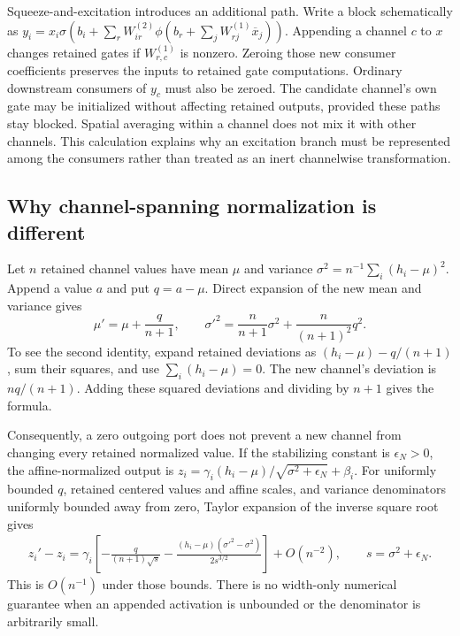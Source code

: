 \documentclass[10pt]{article}
\theoremstyle{paper}
\begin{document}
Squeeze-and-excitation \citep{hu2018squeeze} introduces an additional path. Write a block schematically as $y_i=x_i\sigma(b_i+\sum_rW^{(2)}_{ir}\phi(b_r+\sum_jW^{(1)}_{rj}\overline x_j))$. Appending a channel $c$ to $x$ changes retained gates if $W^{(1)}_{r,c}$ is nonzero. Zeroing those new consumer coefficients preserves the inputs to retained gate computations. Ordinary downstream consumers of $y_c$ must also be zeroed. The candidate channel's own gate may be initialized without affecting retained outputs, provided these paths stay blocked. Spatial averaging within a channel does not mix it with other channels. This calculation explains why an excitation branch must be represented among the consumers rather than treated as an inert channelwise transformation.

\subsection{Why channel-spanning normalization is different}
\label{app:coupling-normalization}
Let $n$ retained channel values have mean $\mu$ and variance $\sigma^2=n^{-1}\sum_i(h_i-\mu)^2$. Append a value $a$ and put $q=a-\mu$. Direct expansion of the new mean and variance gives
\begin{equation}
\mu'=\mu+\frac q{n+1},\qquad
\sigma'^2=\frac n{n+1}\sigma^2+\frac n{(n+1)^2}q^2.
\label{eq:normstats}
\end{equation}
To see the second identity, expand retained deviations as $(h_i-\mu)-q/(n+1)$, sum their squares, and use $\sum_i(h_i-\mu)=0$. The new channel's deviation is $nq/(n+1)$. Adding these squared deviations and dividing by $n+1$ gives the formula.

Consequently, a zero outgoing port does not prevent a new channel from changing every retained normalized value. If the stabilizing constant is $\epsilon_N>0$, the affine-normalized output is $z_i=\gamma_i(h_i-\mu)/\sqrt{\sigma^2+\epsilon_N}+\beta_i$. For uniformly bounded $q$, retained centered values and affine scales, and variance denominators uniformly bounded away from zero, Taylor expansion of the inverse square root gives
\begin{align}
z_i'-z_i
=\gamma_i\left[-\frac q{(n+1)\sqrt{s}}
-\frac{(h_i-\mu)(\sigma'^2-\sigma^2)}{2s^{3/2}}\right]+O(n^{-2}),
\qquad s=\sigma^2+\epsilon_N.
\end{align}
This is $O(n^{-1})$ under those bounds. There is no width-only numerical guarantee when an appended activation is unbounded or the denominator is arbitrarily small.
\end{document}

